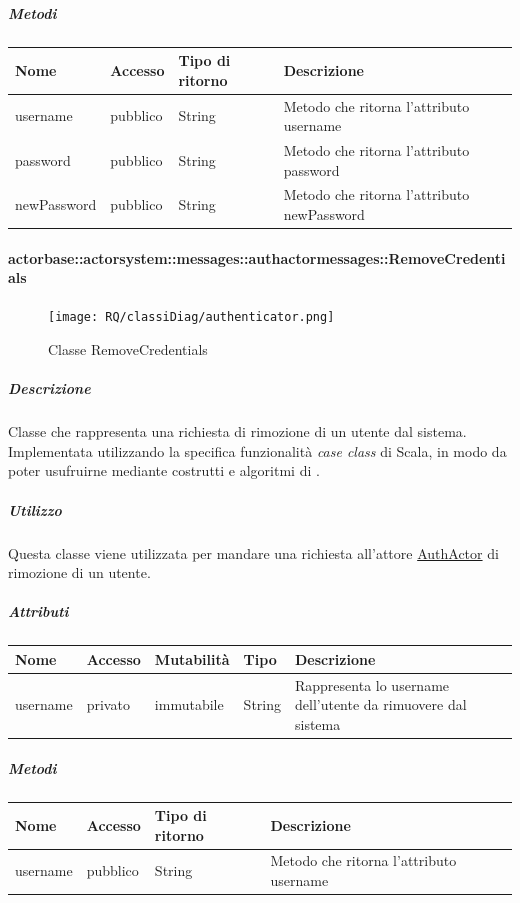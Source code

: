 \documentclass{scalatekids-article}
\begin{document}
\subparagraph{Metodi}
\begin{tabular}{| l | l | l | l |}
  \hline
  Nome & Accesso & Tipo di ritorno & Descrizione\\
  \hline
  username & pubblico & String & Metodo che ritorna l'attributo username\\
  \hline
  password & pubblico & String & Metodo che ritorna l'attributo password\\
  \hline
  newPassword & pubblico & String & Metodo che ritorna l'attributo newPassword\\
  \hline
\end{tabular}

\paragraph{actorbase::actorsystem::messages::authactormessages::RemoveCredentials}
\label{sec:actorbase::actorsystem::messages::authactormessages::RemoveCredentials}

\begin{figure}[H]
  \begin{center}
    \texttt{[image: RQ/classiDiag/authenticator.png]}
    \caption{Classe RemoveCredentials}
  \end{center}
\end{figure}

\subparagraph{Descrizione}
Classe che rappresenta una richiesta di rimozione di un utente dal sistema.\\Implementata utilizzando la specifica funzionalità \textit{case class} di Scala,
in modo da poter usufruirne mediante costrutti e algoritmi di
.

\subparagraph{Utilizzo}
Questa classe viene utilizzata per mandare una richiesta all'attore
\hyperref[sec:actorbase::actorsystem::actors::authactor::AuthActor]{AuthActor}
di rimozione di un utente.

\subparagraph{Attributi}
\begin{tabular}{| p{2cm} | p{1.5cm} | p{2cm} | p{3cm} | p{8.5cm} |}
  \hline
  Nome & Accesso & Mutabilità & Tipo & Descrizione\\
  \hline
  username & privato & immutabile & String & Rappresenta lo username dell'utente da rimuovere dal sistema\\
  \hline
\end{tabular}

\subparagraph{Metodi}
\begin{tabular}{| l | l | l | l |}
  \hline
  Nome & Accesso & Tipo di ritorno & Descrizione\\
  \hline
  username & pubblico & String & Metodo che ritorna l'attributo username\\
  \hline
\end{tabular}
\end{document}
